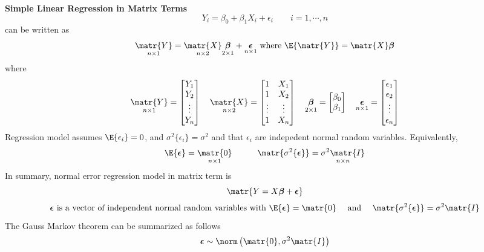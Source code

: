 \documentclass[11pt]{article}
\begin{document}
\begin{defn*}
    \textbf{Simple Linear Regression in Matrix Terms} \\
    \[
        Y_i = \beta_0 + \beta_1 X_i + \epsilon_i \quad \quad i = 1, \cdots, n
    \]
    can be written as 
    \[
        \underset{n\times 1}{\matr{Y}} = \underset{n\times 2}{\matr{X}} \underset{2\times 1}{\boldsymbol{\beta}} + \underset{n\times 1}{\boldsymbol{\epsilon}}
        \text{   where   } \E\{\matr{Y} \} = \matr{X}\boldsymbol{\beta}
    \]
    where
    \[
        \underset{n\times 1}{\matr{Y}} = 
        \begin{bmatrix}
            Y_1 \\ Y_2 \\ \vdots \\ Y_n \\ 
        \end{bmatrix}
        \quad 
        \underset{n\times 2}{\matr{X}} = 
        \begin{bmatrix}
            1 & X_1 \\
            1 & X_2 \\
            \vdots & \vdots \\
            1 & X_n \\ 
        \end{bmatrix}
        \quad 
        \underset{2\times 1}{\boldsymbol{\beta}} = 
        \begin{bmatrix}
            \beta_0 \\ \beta_1 \\ 
        \end{bmatrix}
        \quad 
        \underset{n\times 1}{\boldsymbol{\epsilon}} = 
        \begin{bmatrix}
            \epsilon_1 \\ \epsilon_2 \\ \vdots \\ \epsilon_n
        \end{bmatrix}
    \]
    Regression model assumes $\E\{ \epsilon_i \} = 0$, and $\sigma^2\{\epsilon_i \} = \sigma^2$ and that $\epsilon_i$ are indepedent normal random variables. Equivalently,
    \[
        \E\{ \boldsymbol{\epsilon} \} = \underset{n\times 1}{\matr{0}}
        \quad \quad \quad 
        \matr{\sigma^2\{ \boldsymbol{\epsilon}\}} = \underset{n\times n}{\sigma^2 \matr{I}}
    \]
    In summary, normal error regression model in matrix term is 
    \[
        \matr{Y = X\boldsymbol{\beta} + \boldsymbol{\epsilon}}
    \]
    \[
        \boldsymbol{\epsilon} \text{ is a vector of independent normal random variables with } 
        \E\{ \boldsymbol{\epsilon} \} = \matr{0} \quad \text{ and } \quad 
        \matr{\sigma^2\{ \boldsymbol{\epsilon}\}} = \sigma^2 \matr{I}
    \]
    The Gauss Markov theorem can be summarized as follows
    \[
        \boldsymbol{\epsilon} \sim \norm\left( \matr{0}, \sigma^2 \matr{I} \right)
    \]
\end{defn*}
\end{document}
